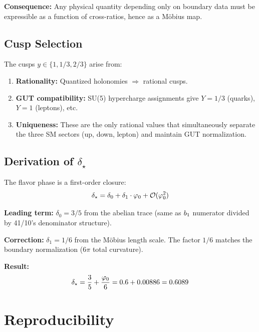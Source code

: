 \textbf{Consequence:} Any physical quantity depending only on boundary data must be 
expressible as a function of cross-ratios, hence as a M\"obius map.

\subsection{Cusp Selection}

The cusps $y \in \{1, 1/3, 2/3\}$ arise from:
\begin{enumerate}[leftmargin=1.5em, topsep=2pt, itemsep=1pt]
    \item \textbf{Rationality:} Quantized holonomies $\Rightarrow$ rational cusps.
    \item \textbf{GUT compatibility:} SU(5) hypercharge assignments give 
        $Y = 1/3$ (quarks), $Y = 1$ (leptons), etc.
    \item \textbf{Uniqueness:} These are the only rational values that simultaneously 
        separate the three SM sectors (up, down, lepton) and maintain GUT normalization.
\end{enumerate}

\subsection{Derivation of $\delta_\star$}

The flavor phase is a first-order closure:
\begin{equation}
    \delta_\star = \delta_0 + \delta_1 \cdot \varphi_0 + \mathcal{O}(\varphi_0^2)
\end{equation}

\textbf{Leading term:} $\delta_0 = 3/5$ from the abelian trace (same as $b_1$ numerator 
divided by 41/10's denominator structure).

\textbf{Correction:} $\delta_1 = 1/6$ from the M\"obius length scale. The factor $1/6$ 
matches the boundary normalization ($6\pi$ total curvature).

\textbf{Result:}
\begin{equation}
    \delta_\star = \frac{3}{5} + \frac{\varphi_0}{6} = 0.6 + 0.00886 = 0.6089
\end{equation}

\section{Reproducibility}
\label{app:repro}

